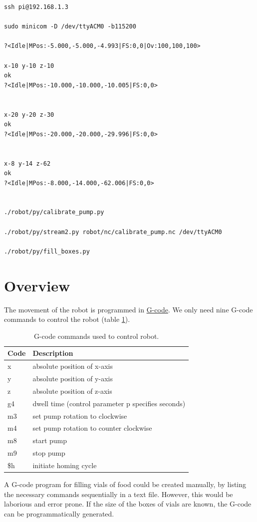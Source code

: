 \documentclass[]{book}
\theoremstyle{definition}
\theoremstyle{definition}
\theoremstyle{remark}
\begin{document}
\begin{verbatim}
ssh pi@192.168.1.3

sudo minicom -D /dev/ttyACM0 -b115200

?<Idle|MPos:-5.000,-5.000,-4.993|FS:0,0|Ov:100,100,100>

x-10 y-10 z-10
ok
?<Idle|MPos:-10.000,-10.000,-10.005|FS:0,0>


x-20 y-20 z-30
ok
?<Idle|MPos:-20.000,-20.000,-29.996|FS:0,0>


x-8 y-14 z-62
ok
?<Idle|MPos:-8.000,-14.000,-62.006|FS:0,0>


./robot/py/calibrate_pump.py

./robot/py/stream2.py robot/nc/calibrate_pump.nc /dev/ttyACM0

./robot/py/fill_boxes.py
\end{verbatim}

\section{Overview}\label{overview-2}

The movement of the robot is programmed in
\href{https://en.wikipedia.org/wiki/G-code}{G-code}. We only need nine
G-code commands to control the robot (table \ref{tab:gCodes}).

\begin{table}

\caption{\label{tab:gCodes}G-code commands used to control robot.}
\centering
\begin{tabular}[t]{ll}
\toprule
Code & Description\\
\midrule
x & absolute position of x-axis\\
y & absolute position of y-axis\\
z & absolute position of z-axis\\
g4 & dwell time (control parameter p specifies seconds)\\
m3 & set pump rotation to clockwise\\
\addlinespace
m4 & set pump rotation to counter clockwise\\
m8 & start pump\\
m9 & stop pump\\
\$h & initiate homing cycle\\
\bottomrule
\end{tabular}
\end{table}

A G-code program for filling vials of food could be created manually, by
listing the necessary commands sequentially in a text file. However,
this would be laborious and error prone. If the size of the boxes of
vials are known, the G-code can be programmatically generated.
\end{document}
